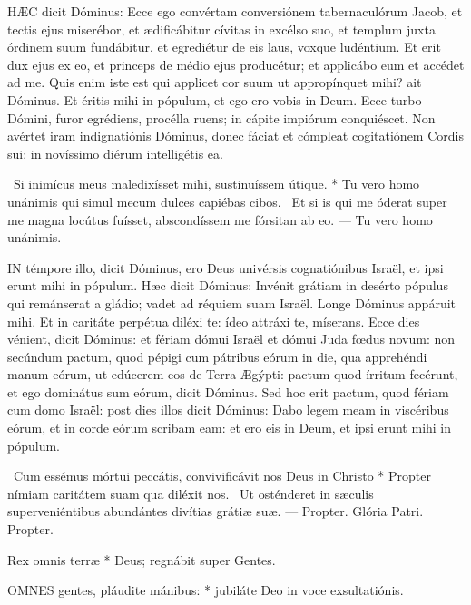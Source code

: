
\lettrine[lines=2]{H}{ÆC} dicit Dóminus: Ecce ego convértam conversiónem tabernaculórum Jacob, et tectis ejus miserébor, et ædificábitur cívitas in excélso suo, et templum juxta órdinem suum fundábitur, et egrediétur de eis laus, voxque ludéntium. Et erit dux ejus ex eo, et princeps de médio ejus producétur; et applicábo eum et accédet ad me. Quis enim iste est qui applicet cor suum ut appropínquet mihi? ait Dóminus. Et éritis mihi in pópulum, et ego ero vobis in Deum. Ecce turbo Dómini, furor egrédiens, procélla ruens; in cápite impiórum conquiéscet. Non avértet iram indignatiónis Dóminus, donec fáciat et cómpleat cogitatiónem Cordis sui: in novíssimo diérum intelligétis ea.

\R\ Si inimícus meus maledixísset mihi, sustinuíssem útique. * Tu vero homo unánimis qui simul mecum dulces capiébas cibos. \V\ Et si is qui me óderat super me magna locútus fuísset, abscondíssem me fórsitan ab eo. --- Tu vero homo unánimis.


\lettrine[lines=2]{I}{N} témpore illo, dicit Dóminus, ero Deus univérsis cognatiónibus Israël, et ipsi erunt mihi in pópulum. Hæc dicit Dóminus: Invénit grátiam in desérto pópulus qui remánserat a gládio; vadet ad réquiem suam Israël. Longe Dóminus appáruit mihi. Et in caritáte perpétua diléxi te: ídeo attráxi te, míserans. Ecce dies vénient, dicit Dóminus: et fériam dómui Israël et dómui Juda fœdus novum: non secúndum pactum, quod pépigi cum pátribus eórum in die, qua apprehéndi manum eórum, ut edúcerem eos de Terra Ægýpti: pactum quod írritum fecérunt, et ego dominátus sum eórum, dicit Dóminus. Sed hoc erit pactum, quod fériam cum domo Israël: post dies illos dicit Dóminus: Dabo legem meam in viscéribus eórum, et in corde eórum scribam eam: et ero eis in Deum, et ipsi erunt mihi in pópulum.

\R\ Cum essémus mórtui peccátis, convivificávit nos Deus in Christo * Propter nímiam caritátem suam qua diléxit nos. \V\ Ut osténderet in sæculis superveniéntibus abundántes divítias grátiæ suæ. --- Propter. Glória Patri. Propter.


 Rex omnis terræ * Deus; regnábit super Gentes.


\lettrine[lines=2]{O}{MNES} gentes, pláudite mánibus: * jubiláte Deo in voce exsultatiónis.

